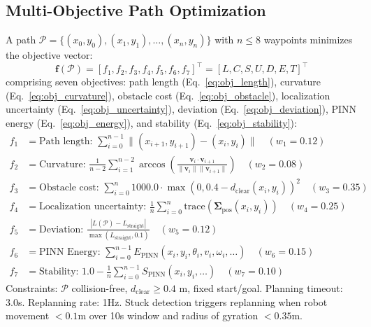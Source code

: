 \documentclass[pdflatex,sn-nature]{sn-jnl}%
\begin{document}
\subsection{Multi-Objective Path Optimization}

A path $\mathcal{P} = \{(x_0, y_0), (x_1, y_1), \ldots, (x_n, y_n)\}$ with $n \leq 8$ waypoints minimizes the objective vector:
\begin{equation}
\mathbf{f}(\mathcal{P}) = [f_1, f_2, f_3, f_4, f_5, f_6, f_7]^\top = [L, C, S, U, D, E, T]^\top
\label{eq:objective_vector}
\end{equation}
comprising seven objectives: path length (Eq.~\ref{eq:obj_length}), curvature (Eq.~\ref{eq:obj_curvature}), obstacle cost (Eq.~\ref{eq:obj_obstacle}), localization uncertainty (Eq.~\ref{eq:obj_uncertainty}), deviation (Eq.~\ref{eq:obj_deviation}), PINN energy (Eq.~\ref{eq:obj_energy}), and stability (Eq.~\ref{eq:obj_stability}):
\begin{align}
f_1 &= \text{Path length: } \sum_{i=0}^{n-1} \|(x_{i+1}, y_{i+1}) - (x_i, y_i)\| \quad (w_1 = 0.12) \label{eq:obj_length} \\
f_2 &= \text{Curvature: } \frac{1}{n-2} \sum_{i=1}^{n-2} \arccos\left( \frac{\mathbf{v}_i \cdot \mathbf{v}_{i+1}}{\|\mathbf{v}_i\| \|\mathbf{v}_{i+1}\|} \right) \quad (w_2 = 0.08) \label{eq:obj_curvature} \\
f_3 &= \text{Obstacle cost: } \sum_{i=0}^{n} 1000.0 \cdot \max(0, 0.4 - d_{\text{clear}}(x_i, y_i))^2 \quad (w_3 = 0.35) \label{eq:obj_obstacle} \\
f_4 &= \text{Localization uncertainty: } \frac{1}{n} \sum_{i=0}^{n} \text{trace}(\mathbf{\Sigma}_{\text{pos}}(x_i, y_i)) \quad (w_4 = 0.25) \label{eq:obj_uncertainty} \\
f_5 &= \text{Deviation: } \frac{|L(\mathcal{P}) - L_{\text{straight}}|}{\max(L_{\text{straight}}, 0.1)} \quad (w_5 = 0.12) \label{eq:obj_deviation} \\
f_6 &= \text{PINN Energy: } \sum_{i=0}^{n-1} E_{\text{PINN}}(x_i, y_i, \theta_i, v_i, \omega_i, \ldots) \quad (w_6 = 0.15) \label{eq:obj_energy} \\
f_7 &= \text{Stability: } 1.0 - \frac{1}{n} \sum_{i=0}^{n-1} S_{\text{PINN}}(x_i, y_i, \ldots) \quad (w_7 = 0.10) \label{eq:obj_stability}
\end{align}
Constraints: $\mathcal{P}$ collision-free, $d_{\text{clear}} \geq 0.4$ m, fixed start/goal. Planning timeout: 3.0s. Replanning rate: 1Hz. Stuck detection triggers replanning when robot movement $< 0.1$m over 10s window and radius of gyration $< 0.35$m.
\end{document}
